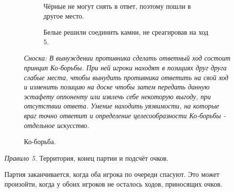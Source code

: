 \documentclass[14pt,a4paper]{extarticle}
\newcommand{\stone}[3]{\filldraw[color=black, fill=#3, very thick](#1,#2) circle(0.45);}
\newcommand{\stonelabel}[4]{\node[text=#3] at (#1,#2) {#4};}
\begin{document}
\begin{figure}[H]
    \begin{subfigure}[t]{0.4\textwidth}
    \caption{Чёрные не могут снять в ответ, поэтому пошли в другое место.}
    \label{9e}
    \end{subfigure}
    \hfill
    \begin{subfigure}[t]{0.4\textwidth}
    \caption{Белые решили соединить камни, не среагировав на ход 5.}
    \label{9f}
    \end{subfigure}
    \caption{Ко-борьба.}
    \textit{
    Сноска: В вынуждении противника сделать ответный ход состоит принцип Ко-борьбы. При ней игроки находят в позициях друг друга слабые места, чтобы вынудить противника ответить на свой ход и изменить позицию на доске чтобы затем передать данную эстафету оппоненту или извлечь себе некоторую выгоду, при отсутствии ответа. Умение находить уязвимости, на которые враг точно ответит и определение целесообразности Ко-борьбы - отдельное искусство.
    }
    \label{9}
\end{figure}


\textit{Правило 5.} Территория, конец партии и подсчёт очков.

Партия заканчивается, когда оба игрока по очереди спасуют. Это может произойти, когда у обоих игроков не осталось ходов, приносящих очков.
\end{document}
